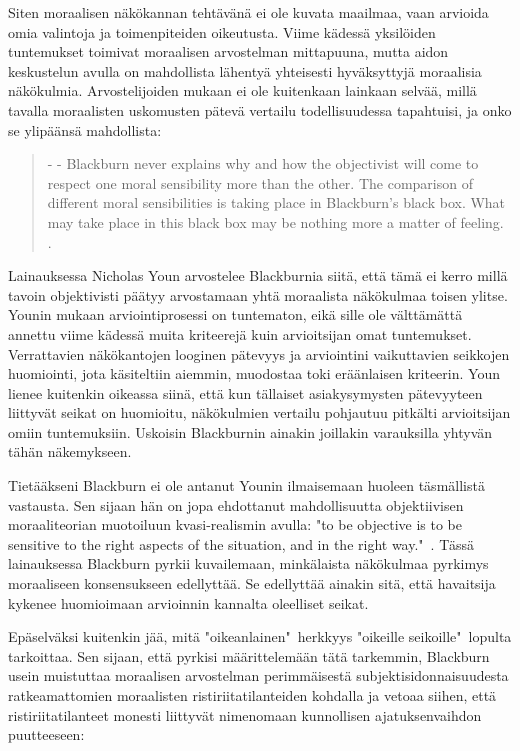 \documentclass[a4paper,12pt,times,titlepage,finnish]{article}
\begin{document}
Siten moraalisen näkökannan tehtävänä ei ole kuvata maailmaa, vaan arvioida omia valintoja ja toimenpiteiden oikeutusta. Viime kädessä yksilöiden tuntemukset toimivat moraalisen arvostelman mittapuuna, mutta aidon keskustelun avulla on mahdollista lähentyä yh\-tei\-ses\-ti hyväksyttyjä moraalisia näkökulmia. Arvostelijoiden mukaan ei ole kuitenkaan lainkaan selvää, millä tavalla moraalisten uskomusten pätevä vertailu todellisuudessa tapahtuisi, ja onko se ylipäänsä mahdollista:

\begin{quote}
	- - Blackburn never explains why and how the objectivist will come to respect one moral sensibility more than the other. The comparison of different moral sensibilities is taking place in Blackburn's black box. What may take place in this black box may be nothing more a matter of feeling. \citep[116]{Youn05}.
\end{quote}

Lainauksessa Nicholas Youn arvostelee Blackburnia siitä, että tämä ei kerro millä tavoin objektivisti päätyy arvostamaan yhtä moraalista näkökulmaa toisen ylitse. Younin mukaan arviointiprosessi on tuntematon, eikä sille ole välttämättä annettu viime kädessä muita kriteerejä kuin arvioitsijan omat tuntemukset. Verrattavien näkökantojen looginen pätevyys ja arviointini vaikuttavien seikkojen huomiointi, jota käsiteltiin aiemmin, muodostaa toki eräänlaisen kriteerin. Youn lienee kuitenkin oikeassa siinä, että kun tällaiset asiakysymysten pätevyyteen liittyvät seikat on huomioitu, näkökulmien vertailu pohjautuu pitkälti arvioitsijan omiin tuntemuksiin. Uskoisin Blackburnin ainakin joillakin varauksilla yhtyvän tähän näkemykseen.

Tietääkseni Blackburn ei ole antanut Younin ilmaisemaan huoleen täsmällistä vastausta. Sen sijaan hän on jopa ehdottanut mahdollisuutta objektiivisen moraaliteorian muotoiluun kvasi-\-realismin avulla: "to be objective is to be sensitive to the right aspects of the situation, and in the right way."\ \citep[221]{Blackburn99}. Tässä lainauksessa Blackburn pyrkii kuvailemaan, minkälaista näkökulmaa pyrkimys moraaliseen konsensukseen edellyttää. Se edellyttää ainakin sitä, että havaitsija kykenee huomioimaan arvioinnin kannalta oleelliset seikat. 

Epäselväksi kuitenkin jää, mitä "oikeanlainen"\ herkkyys "oikeille seikoille"\ lopulta tarkoittaa. Sen sijaan, että pyrkisi määrittelemään tätä tarkemmin, Blackburn usein muistuttaa moraalisen arvostelman perimmäisestä subjektisidonnaisuudesta ratkeamattomien moraalisten ristiriitatilanteiden kohdalla ja vetoaa siihen, että ristiriitatilanteet monesti liittyvät nimenomaan kunnollisen ajatuksenvaihdon puutteeseen:
\end{document}
